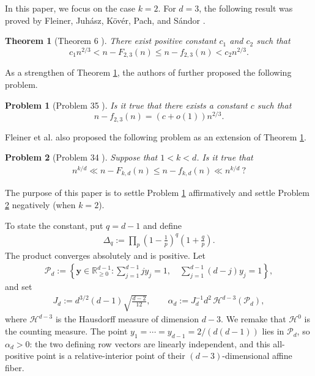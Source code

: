\documentclass[10pt,a4paper]{amsart}
\numberwithin{equation}{section}
\newcommand{\R}{\mathbb R}
\newcommand{\cH}{\mathcal H}
\newcommand{\cP}{\mathcal P}
\newcommand{\1}{\mathbf 1}
\newcommand{\bsy}{\boldsymbol y}
\newtheorem{theorem}{Theorem}[section]
\newtheorem{problem}{Problem}
\begin{document}
In this paper, we focus on the case $k=2$. For $d=3$, the following result was proved by Fleiner, Juh\'asz, K\"ov\'er, Pach, and S\'andor \cite{FJKPS}.

\begin{theorem}[Theorem 6 \cite{FJKPS}]\label{thm1}There exist positive constant $c_1$ and $c_2$ such that 
$$c_1n^{2/3}<n-F_{2,3}(n)\le n-f_{2,3}(n)<c_2n^{2/3}.$$
\end{theorem}
As a strengthen of Theorem \ref{thm1}, the authors of \cite{FJKPS} further proposed the following problem. 
\begin{problem}[Problem 35 \cite{FJKPS}]\label{P1}Is it true that there exists a constant $c$ such that 
$$n-f_{2,3}(n)=(c+o(1))n^{2/3}.$$
\end{problem}
Fleiner et al. \cite{FJKPS} also proposed the following problem as an extension of Theorem \ref{thm1}.
\begin{problem}[Problem 34 \cite{FJKPS}]\label{P2}Suppose that $1<k<d$. Is it true that
\begin{align}\label{P2eq}
n^{k/d}\ll n-F_{k,d}(n)\leq n-f_{k,d}(n)\ll n^{k/d}\ ?
\end{align}
\end{problem}

The purpose of this paper is to settle Problem \ref{P1} affirmatively and settle Problem \ref{P2} negatively (when
$k=2$).

To state the constant, put $q=d-1$ and define
\begin{align}
 \Delta_q:=\prod_p\left(1-\frac1p\right)^q
                  \left(1+\frac qp\right).
 \label{eq:Delta}
\end{align}
The product converges absolutely and is positive.  Let
\begin{align}
 \cP_d:=\left\{\bsy\in\R_{\geq0}^{d-1}:
 \sum_{j=1}^{d-1}j y_j=1,
 \quad
 \sum_{j=1}^{d-1}(d-j)y_j=1
 \right\},
\label{eq:polytope}
\end{align}
and set
\begin{align}
 J_d:=d^{3/2}(d-1)\sqrt{\frac{d-2}{12}},
 \qquad
 \alpha_d:=J_d^{-1}d^2\,
 \cH^{d-3}(\cP_d),
\label{eq:alpha}
\end{align}
where $\cH^{d-3}$ is the Hausdorff measure of dimension $d-3$. We remake that $\cH^0$ is the counting measure.  The point
$y_1=\cdots=y_{d-1}=2/(d(d-1))$ lies in $\cP_d$, so
$\alpha_d>0$: the two defining row vectors are linearly independent,
and this all-positive point is a relative-interior point of their
$(d-3)$-dimensional affine fiber.
\end{document}
